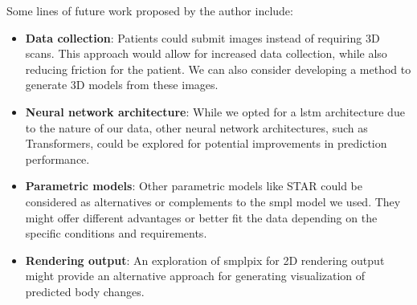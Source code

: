 Some lines of future work proposed by the author include:

\begin{itemize}
      \item \textbf{Data collection}: Patients could submit images instead of
            requiring 3D scans. This approach would allow for increased data collection,
            while also reducing friction for the patient. We can also consider
            developing a method to generate 3D models from these images.

      \item \textbf{Neural network architecture}: While we opted for a \gls{lstm}
            architecture due to the nature of our data, other neural network architectures,
            such as Transformers, could be explored for potential improvements in
            prediction performance.

      \item \textbf{Parametric models}: Other parametric models like STAR could
            be considered as alternatives or complements to the \gls{smpl}
            model we used. They might offer different advantages or better fit
            the data depending on the specific conditions and requirements.

      \item \textbf{Rendering output}: An exploration of smplpix for 2D
            rendering output might provide an alternative approach for generating
            visualization of predicted body changes.
\end{itemize}